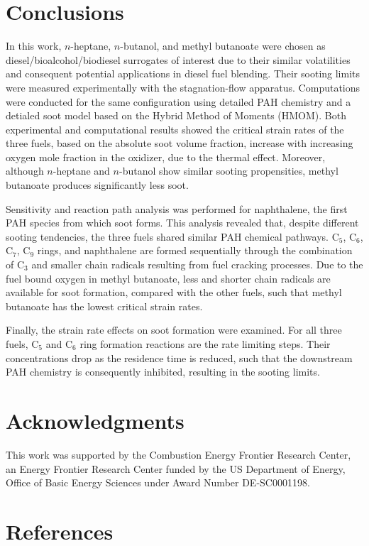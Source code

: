 \documentclass[review,3p,times]{elsarticleUS}
\begin{document}
\section{Conclusions}           

In this work, $n$-heptane, $n$-butanol, and methyl butanoate were chosen as diesel/bioalcohol/biodiesel surrogates of interest due to their similar volatilities and consequent potential applications in diesel fuel blending. Their sooting limits were measured experimentally with the stagnation-flow apparatus. Computations were conducted for the same configuration using detailed PAH chemistry and a detialed soot model based on the Hybrid Method of Moments (HMOM). Both experimental and computational results showed the critical strain rates of the three fuels, based on the absolute soot volume fraction, increase with increasing oxygen mole fraction in the oxidizer, due to the thermal effect. Moreover, although $n$-heptane and $n$-butanol show similar sooting propensities, methyl butanoate produces significantly less soot.

Sensitivity and reaction path analysis was performed for naphthalene, the first PAH species from which soot forms. This analysis revealed that, despite different sooting tendencies, the three fuels shared similar PAH chemical pathways. C$_5$, C$_6$, C$_7$, C$_9$ rings, and naphthalene are formed sequentially through the combination of C$_3$ and smaller chain radicals resulting from fuel cracking processes. Due to the fuel bound oxygen in methyl butanoate, less and shorter chain radicals are available for soot formation, compared with the other fuels, such that methyl butanoate has the lowest critical strain rates.

Finally, the strain rate effects on soot formation were examined. For all three fuels, C$_5$ and C$_6$ ring formation reactions are the rate limiting steps. Their concentrations drop as the residence time is reduced, such that the downstream PAH chemistry is consequently inhibited, resulting in the sooting limits. 

\section*{Acknowledgments}
This work was supported by the Combustion Energy Frontier Research Center, an Energy Frontier Research Center funded by the US Department of Energy, Office of Basic Energy Sciences under Award Number DE-SC0001198.

\section*{References}



\renewcommand{\thefigure}{\arabic{figure}}
\renewcommand{\thetable}{\arabic{table}}
\end{document}
